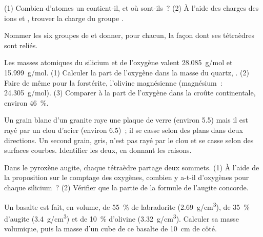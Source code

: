 \begin{exercise}[$\star$]\label{exo:g11:minerals:4}
(1) Combien d'atomes un  contient-il, et où
sont-ils~? (2) À l'aide des charges des ions  et ,
trouver la charge du groupe .
\end{exercise}

\begin{exercise}[$\star$]\label{exo:g11:minerals:5}
Nommer les six groupes de  et donner, pour
chacun, la façon dont ses tétraèdres sont reliés.
\end{exercise}

\begin{exercise}[$\star\star$]\label{exo:g11:minerals:6}
Les masses atomiques du silicium et de l'oxygène valent \qty{28.085}{g/mol}
et \qty{15.999}{g/mol}. (1) Calculer la part de l'oxygène dans la masse du
quartz, . (2) Faire de même pour la forstérite, l'olivine
magnésienne  (magnésium~: \qty{24.305}{g/mol}). (3) Comparer à
la part de l'oxygène dans la croûte continentale, environ
\qty{46}{\percent}.
\end{exercise}

\begin{exercise}[$\star\star$]\label{exo:g11:minerals:7}
Un grain blanc d'un granite raye une plaque de verre (environ 5.5) mais il
est rayé par un clou d'acier (environ 6.5)~; il se casse selon des plans
dans deux directions. Un second grain, gris, n'est pas rayé par le clou et
se casse selon des surfaces courbes. Identifier les deux, en donnant les
raisons.
\end{exercise}

\begin{exercise}[$\star\star$]\label{exo:g11:minerals:8}
Dans le pyroxène augite, chaque tétraèdre partage deux sommets. (1) À
l'aide de la proposition sur le comptage des oxygènes, combien y a-t-il
d'oxygènes pour chaque silicium~? (2) Vérifier que la partie
 de la formule de l'augite concorde.
\end{exercise}

\begin{exercise}[$\star\star$]\label{exo:g11:minerals:9}
Un basalte est fait, en volume, de \qty{55}{\percent} de labradorite
(\qty{2.69}{g/cm^3}), de \qty{35}{\percent} d'augite (\qty{3.4}{g/cm^3}) et
de \qty{10}{\percent} d'olivine (\qty{3.32}{g/cm^3}). Calculer sa masse
volumique, puis la masse d'un cube de ce basalte de \qty{10}{cm} de côté.
\end{exercise}

